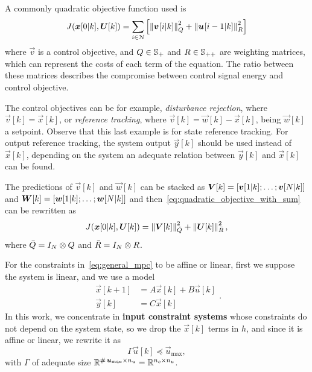 \documentclass[../main.tex]{subfiles}
\begin{document}
A commonly quadratic objective function used is
\begin{equation}
  \label{eq:quadratic_objective_with_sum}
  J(\vec{x}[0|k],\vec{U}[k])=\sum_{i\in\predictionSet}\left[\norm{\mpcvec{v}[ ][i][k]}^{2}_{Q} +\norm{\mpcvec{u}[ ][i-1][k]}^{2}_{R}\right]
\end{equation}
where $\vec{v}$ is a control objective, and ${ Q\in\mathbb{S}_{+} }$ and ${ R\in\mathbb{S}_{++} }$ are weighting matrices, which can represent the costs of each term of the equation.
The ratio between these matrices describes the compromise between control signal energy and control objective.

The control objectives can be for example, \emph{disturbance rejection}, where ${ \vec{v}[k]=\vec{x}[k] }$, or \emph{reference tracking}, where ${ \vec{v}[k]=\vec{w}[k]-\vec{x}[k] }$, being $\vec{w}[k]$ a setpoint.
Observe that this last example is for state reference tracking.
For output reference tracking, the system output $\vec{y}[k]$ should be used instead of $\vec{x}[k]$, depending on the system an adequate relation between $\vec{y}[k]$ and $\vec{x}[k]$ can be found.

The predictions of $\vec{v}[k]$ and $\vec{w}[k]$ can be stacked as ${ \boldsymbol{V}[k]=[\boldsymbol{v}[1|k];\dots;\boldsymbol{v}[N|k]] }$ and
${ \boldsymbol{W}[k]=[\boldsymbol{w}[1|k];\dots;\boldsymbol{w}[N|k]] }$ and then~\eqref{eq:quadratic_objective_with_sum} can be rewritten as
\begin{equation}
  \label{eq:quadratic_objective_compact}
  J(\boldsymbol{x}[0|k],\boldsymbol{U}[k])=\left\lVert\boldsymbol{V}[k]\right\rVert^{2}_{\bar{Q}} + \left\lVert\boldsymbol{U}[k] \right\rVert^{2}_{\bar{R}},
\end{equation}
where $\bar{Q}=I_{N}\otimes Q$ and
$\bar{R}=I_{N}\otimes R$.

For the constraints in~\eqref{eq:general_mpc} to be affine or linear, first we suppose the system is linear, and we use a \lti{} model
\begin{equation}\label{eq:large_scale_system_model}
  \begin{array}{rl}
    \vec{x}[k+1]&=A\vec{x}[k]+B\vec{u}[k]\\
    \vec{y}[k]&=C\vec{x}[k]
  \end{array}
.
\end{equation}
In this work, we concentrate in \textbf{input constraint systems} whose constraints do not depend on the system state, so we drop the $\vec{x}[k]$ terms in $h$, and since it is affine or linear, we rewrite it as
\begin{equation}
  \label{eq:linear_constraint}
  \Gamma\vec{u}[k]\preceq\vec{u}_{\max},
\end{equation}
with $\Gamma$ of adequate size $\mathbb{R}^{\operatorname{\#}{\boldsymbol{u}_{\max}}\times n_{u} }=\mathbb{R}^{n_{c}\times n_{u} }$.
\end{document}

